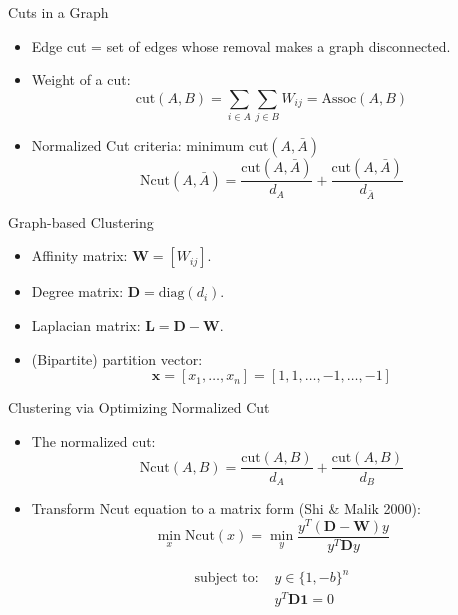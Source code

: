\documentclass[10pt,mathserif]{beamer}
\begin{document}
\begin{frame}{Cuts in a Graph}
\begin{itemize}
    \item Edge cut = set of edges whose removal makes a graph disconnected.
    \item Weight of a cut:
    \begin{equation*}
        \text{cut}(A, B) = \sum_{i \in A}\sum_{j \in B}W_{ij} = \text{Assoc}(A, B) 
    \end{equation*}
    \item Normalized Cut criteria: minimum $\text{cut}(A, \bar{A})$
    \begin{equation*}
        \text{Ncut}(A, \bar{A}) = \frac{\text{cut}(A, \bar{A})}{d_A} + \frac{\text{cut}(A, \bar{A})}{d_{\bar{A}}} 
    \end{equation*}
\end{itemize}  
\end{frame}

\begin{frame}{Graph-based Clustering}
\begin{itemize}
    \item Affinity matrix: $\bm{W} = [ W_{ij} ]$.
    \item Degree matrix: $\bm{D} = \text{diag}(d_i)$.
    \item Laplacian matrix: $\bm{L} = \bm{D} - \bm{W}$.
    \item (Bipartite) partition vector: 
    \begin{equation*}
        \bm{x} = [x_1,\ldots,x_n] = [1,1,\ldots,-1,\ldots,-1]
    \end{equation*}
\end{itemize}  
\end{frame}

\begin{frame}{Clustering via Optimizing Normalized Cut}
\begin{itemize}
    \item The normalized cut:
    \begin{equation*}
        \text{Ncut}(A, B) = \frac{\text{cut}(A, B)}{d_A} +  \frac{\text{cut}(A, B)}{d_B}
    \end{equation*}
    
    \item Transform Ncut equation to a matrix form (Shi \& Malik 2000):
    \begin{equation*}
    \min_x \text{Ncut} (x) =  \min_y \frac{y^T(\bm{D}-\bm{W})y}{y^T\bm{D}y}
    \end{equation*}
    
    \begin{equation*}
        \begin{split}
            \text{subject to: } & y \in \{1,-b\}^n \\ & y^T\bm{D}\bm{1} = 0 
        \end{split}
    \end{equation*}
\end{itemize}  
\end{frame}
\end{document}
